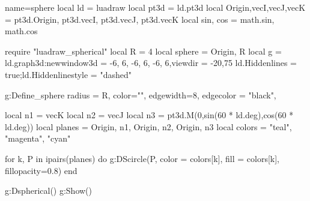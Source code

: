\documentclass{standalone}
\begin{document}
\begin{luadraw}{name=sphere}
    local ld = luadraw
    local pt3d = ld.pt3d
    local Origin,vecI,vecJ,vecK = pt3d.Origin, pt3d.vecI, pt3d.vecJ, pt3d.vecK
    local sin, cos = math.sin, math.cos

    require "luadraw_spherical"
    local R = 4
    local sphere = {Origin, R}
    local g = ld.graph3d:new{window3d = {-6, 6, -6, 6, -6, 6},viewdir = {-20,75}}
    ld.Hiddenlines = true;ld.Hiddenlinestyle = "dashed"

    g:Define_sphere{
        radius = R,
        color="",
        edgewidth=8,
        edgecolor = "black",
    }

    local n1 = vecK
    local n2 = vecJ
    local n3 = pt3d.M(0,sin(60 * ld.deg),cos(60 * ld.deg))
    local planes = { {Origin, n1}, {Origin, n2}, {Origin, n3} }
    local colors = {"teal", "magenta", "cyan"}

    for k, P in ipairs(planes)  do
        g:DScircle(P, {color = colors[k], fill = colors[k], fillopacity=0.8})
    end

    g:Dspherical()
    g:Show()
\end{luadraw}
\end{document}
